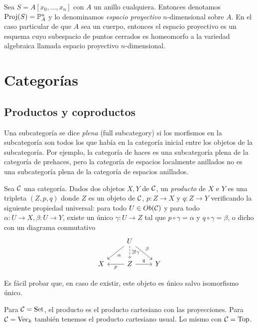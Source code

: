 \documentclass[GA.tex]{subfiles}
\begin{document}
\begin{ej}
Sea $S=A[x_0,\dots, x_n]$ con $A$ un anillo cualquiera. Entonces denotamos $\operatorname{Proj}(S)=\mathbb{P}^n_A$ y lo denominamos \emph{espacio proyectivo} $n$-dimensional sobre $A$. En el caso particular de que $A$ sea un cuerpo, entonces el espacio proyectivo es un esquema cuyo subespacio de puntos cerrados es homeomorfo a la variedad algebraica llamada espacio proyectivo $n$-dimensional. 
\end{ej}

\section{Categorías}
\subsection{Productos y coproductos}

\begin{nota}
Una subcategoría se dice \emph{plena} (full subcategory) si los morfismos en la subcategoría son todos los que había en la categoría inicial entre los objetos de la subcategoría. Por ejemplo, la categoría de haces es una subcategoría plena de la categoría de prehaces, pero la categoría de espacios localmente anillados no es una subcategoría plena de la categoría de espacios anillados.
\end{nota}

\begin{defi}
Sea $\mathcal{C}$ una categoría. Dados dos objetos $X,Y$ de $\mathcal{C}$, un \emph{producto} de $X$ e $Y$ es una tripleta $(Z,p,q)$ donde $Z$ es un objeto de $\mathcal{C}$, $p:Z\to X$ y $q:Z\to Y$ verificando la siguiente propiedad universal: para todo $U\in Ob(\mathcal{C})$ y para todo $\alpha:U\to X, \beta:U\to Y$, existe un único $\gamma:U\to Z$ tal que $p\circ\gamma=\alpha$ y $q\circ\gamma=\beta$, o dicho con un diagrama conmutativo
\[
\begin{tikzcd}
& U\arrow[dl, "\alpha"]\arrow[dr, "\beta"]\arrow[d, dashed, "\exists!\gamma"] & \\
X & Z\arrow[r, "q"]\arrow[l, "p"] & Y
\end{tikzcd}
\]
\end{defi}
Es fácil probar que, en caso de existir, este objeto es único salvo isomorfismo único.
\begin{ej}
Para $\mathcal{C}=\mathrm{Set}$, el producto es el producto cartesiano con las proyecciones. Para $\mathcal{C}=\mathrm{Vec}_k$ también tenemos el producto cartesiano usual. Lo mismo con $\mathcal{C}=\mathrm{Top}$. 
\end{ej}
\end{document}
